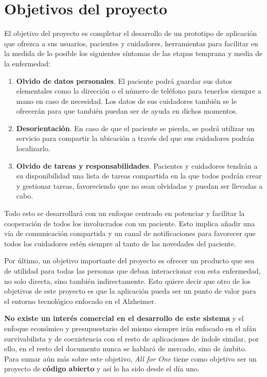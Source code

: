 \section{Objetivos del proyecto}

El objetivo del proyecto es completar el desarrollo de un prototipo de aplicación que ofrezca a sus usuarios, pacientes y cuidadores, herramientas para facilitar en la medida de lo posible los siguientes síntomas de las etapas temprana y media de la enfermedad:

\begin{enumerate}
    \item \textbf{Olvido de datos personales}. El paciente podrá guardar sus datos elementales como la dirección o el número de teléfono para tenerlos siempre a mano en caso de necesidad. Los datos de sus cuidadores también se le ofrecerán para que también puedan ser de ayuda en dichos momentos.
    \item \textbf{Desorientación}. En caso de que el paciente se pierda, se podrá utilizar un servicio para compartir la ubicación a través del que sus cuidadores podrán localizarlo.
    \item \textbf{Olvido de tareas y responsabilidades}. Pacientes y cuidadores tendrán a su disponibilidad una lista de tareas compartida en la que todos podrán crear y gestionar tareas, favoreciendo que no sean olvidadas y puedan ser llevadas a cabo.
\end{enumerate}

Todo esto se desarrollará con un enfoque centrado en potenciar y facilitar la cooperación de todos los involucrados con un paciente. Esto implica añadir una vía de comunicación compartida y un canal de notificaciones para favorecer que todos los cuidadores estén siempre al tanto de las novedades del paciente.

Por último, un objetivo importante del proyecto es ofrecer un producto que sea de utilidad para todas las personas que deban interaccionar con esta enfermedad, no solo directa, sino también indirectamente. Esto quiere decir que otro de los objetivos de este proyecto es que la aplicación pueda ser un punto de valor para el entorno tecnológico enfocado en el Alzheimer. 

\textbf{No existe un interés comercial en el desarrollo de este sistema} y el enfoque económico y presupuestario del mismo siempre irán enfocado en el afán survivabilista y de coexistencia con el resto de aplicaciones de índole similar, por ello, en el resto del documento nunca se hablará de mercado, sino de ámbito. Para sumar aún más sobre este objetivo, \emph{All for One} tiene como objetivo ser un proyecto de \textbf{código abierto} y así lo ha sido desde el día uno.